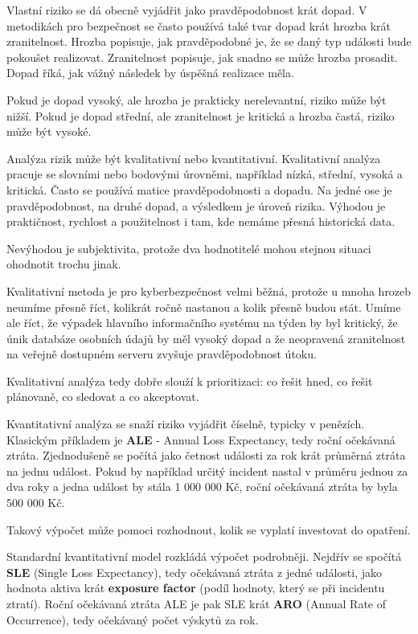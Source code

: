 \documentclass[11pt,a4paper]{article}
\begin{document}
Vlastní riziko se dá obecně vyjádřit jako pravděpodobnost krát dopad. V metodikách pro bezpečnost se často používá také tvar dopad krát hrozba krát zranitelnost. Hrozba popisuje, jak pravděpodobné je, že se daný typ události bude pokoušet realizovat. Zranitelnost popisuje, jak snadno se může hrozba prosadit. Dopad říká, jak vážný následek by úspěšná realizace měla.

Pokud je dopad vysoký, ale hrozba je prakticky nerelevantní, riziko může být nižší. Pokud je dopad střední, ale zranitelnost je kritická a hrozba častá, riziko může být vysoké.

Analýza rizik může být kvalitativní nebo kvantitativní. Kvalitativní analýza pracuje se slovními nebo bodovými úrovněmi, například nízká, střední, vysoká a kritická. Často se používá matice pravděpodobnosti a dopadu. Na jedné ose je pravděpodobnost, na druhé dopad, a výsledkem je úroveň rizika. Výhodou je praktičnost, rychlost a použitelnost i tam, kde nemáme přesná historická data.

Nevýhodou je subjektivita, protože dva hodnotitelé mohou stejnou situaci ohodnotit trochu jinak.

Kvalitativní metoda je pro kyberbezpečnost velmi běžná, protože u mnoha hrozeb neumíme přesně říct, kolikrát ročně nastanou a kolik přesně budou stát. Umíme ale říct, že výpadek hlavního informačního systému na týden by byl kritický, že únik databáze osobních údajů by měl vysoký dopad a že neopravená zranitelnost na veřejně dostupném serveru zvyšuje pravděpodobnost útoku.

Kvalitativní analýza tedy dobře slouží k prioritizaci: co řešit hned, co řešit plánovaně, co sledovat a co akceptovat.

Kvantitativní analýza se snaží riziko vyjádřit číselně, typicky v penězích. Klasickým příkladem je \textbf{ALE} - Annual Loss Expectancy, tedy roční očekávaná ztráta. Zjednodušeně se počítá jako četnost události za rok krát průměrná ztráta na jednu událost. Pokud by například určitý incident nastal v průměru jednou za dva roky a jedna událost by stála 1 000 000 Kč, roční očekávaná ztráta by byla 500 000 Kč.

Takový výpočet může pomoci rozhodnout, kolik se vyplatí investovat do opatření.

Standardní kvantitativní model rozkládá výpočet podrobněji. Nejdřív se spočítá \textbf{SLE} (Single Loss Expectancy), tedy očekávaná ztráta z jedné události, jako hodnota aktiva krát \textbf{exposure factor} (podíl hodnoty, který se při incidentu ztratí). Roční očekávaná ztráta ALE je pak SLE krát \textbf{ARO} (Annual Rate of Occurrence), tedy očekávaný počet výskytů za rok.
\end{document}
